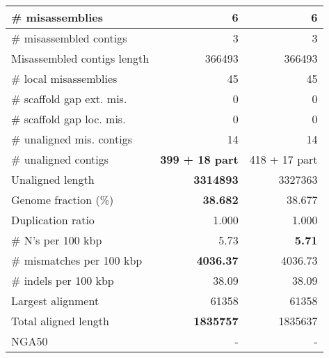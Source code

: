 \documentclass[12pt,a4paper]{article}
\begin{document}
\begin{table}[ht]
\begin{center}
\begin{tabular}{|l*{2}{|r}|}
\# misassemblies & 6 & 6 \\ \hline
\# misassembled contigs & 3 & 3 \\ \hline
Misassembled contigs length & 366493 & 366493 \\ \hline
\# local misassemblies & 45 & 45 \\ \hline
\# scaffold gap ext. mis. & 0 & 0 \\ \hline
\# scaffold gap loc. mis. & 0 & 0 \\ \hline
\# unaligned mis. contigs & 14 & 14 \\ \hline
\# unaligned contigs & {\bf 399 + 18 part} & 418 + 17 part \\ \hline
Unaligned length & {\bf 3314893} & 3327363 \\ \hline
Genome fraction (\%) & {\bf 38.682} & 38.677 \\ \hline
Duplication ratio & 1.000 & 1.000 \\ \hline
\# N's per 100 kbp & 5.73 & {\bf 5.71} \\ \hline
\# mismatches per 100 kbp & {\bf 4036.37} & 4036.73 \\ \hline
\# indels per 100 kbp & 38.09 & 38.09 \\ \hline
Largest alignment & 61358 & 61358 \\ \hline
Total aligned length & {\bf 1835757} & 1835637 \\ \hline
NGA50 & - & - \\ \hline
\end{tabular}
\end{center}
\end{table}
\end{document}
